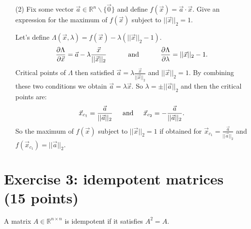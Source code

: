 \begin{itemize}
\item[(2)] Fix some vector $\vec{a}\in \mathds{R}^n\backslash \{\vec{0}\}$ and define $f(\vec{x}) = \vec{a} \cdot \vec{x}$. Give an expression for the maximum of $f(\vec{x})$ subject to $||\vec{x}||_2 = 1$.
  \begin{correction}
    Let's define $\Lambda(\vec{x}, \lambda) = f(\vec{x}) - \lambda(||\vec{x}||_2 - 1)$.
    $$\frac{\partial \Lambda}{\partial \vec{x}} = \vec{a} - \lambda \frac{\vec{x}}{||\vec{x}||_2} \text{\hspace{1cm} and \hspace{1cm}} \frac{\partial \Lambda}{\partial \lambda} = ||\vec{x}||_2 - 1 \text{.}$$
    Critical points of $\Lambda$ then satisfied $\vec{a} = \lambda \frac{\vec{x}}{||\vec{x}||_2}$ and $||\vec{x}||_2 = 1$.
    By combining these two conditions we obtain $\vec{a} = \lambda \vec{x}$. So $\lambda = \pm ||\vec{a}||_2$ and then the critical points are: 
    $$\vec{x}_{c_1} = \frac{\vec{a}}{||\vec{a}||_2} \text{\hspace{0.4cm} and \hspace{0.4cm}} \vec{x}_{c_2} = -\frac{\vec{a}}{||\vec{a}||_2}\text{.}$$
    So the maximum of $f(\vec{x})$ subject to $||\vec{x}||_2 = 1$ if obtained for $\vec{x}_{c_1} = \frac{\vec{a}}{||\vec{a}||_2}$ and $f(\vec{x}_{c_1}) = ||\vec{a}||_2$.
\end{correction}

\end{itemize}


\section{Exercise 3: idempotent matrices  \normalsize \textnormal(15 points)}

A matrix  $A \in \mathds{R}^{n \times n}$ is idempotent if it satisfies $A^2 = A$.

